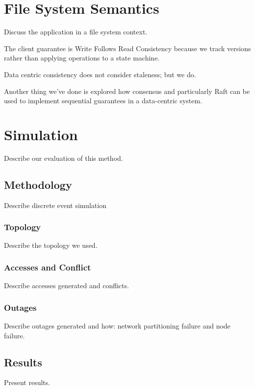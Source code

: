 \documentclass[letterpaper,twocolumn,10pt]{article}
\begin{document}
\section{File System Semantics}

Discuss the application in a file system context.

The client guarantee is Write Follows Read Consistency because we track versions rather than applying operations to a state machine.

Data centric consistency does not consider staleness; but we do.

Another thing we've done is explored how consensus and particularly Raft can be used to implement sequential guarantees in a data-centric system. 

\section{Simulation}

Describe our evaluation of this method.

\subsection{Methodology}

Describe discrete event simulation

\subsubsection{Topology}

Describe the topology we used.

\subsubsection{Accesses and Conflict}

Describe accesses generated and conflicts.

\subsubsection{Outages}

Describe outages generated and how: network partitioning failure and node failure.

\subsection{Results}

Present results.
\end{document}
